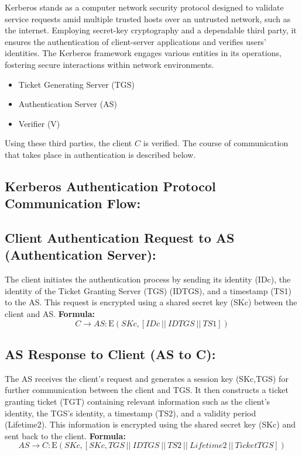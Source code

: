 \documentclass[11pt]{article}
\begin{document}
Kerberos stands as a computer network security protocol designed to validate service requests amid multiple trusted hosts over an untrusted network, such as the internet. Employing secret-key cryptography and a dependable third party, it ensures the authentication of client-server applications and verifies users' identities. The Kerberos framework engages various entities in its operations, fostering secure interactions within network environments.

\begin{itemize}
    \item Ticket Generating Server (TGS)
    \item Authentication Server (AS)
    \item Verifier (V)
\end{itemize}

Using these third parties, the client \(C\) is verified. The course of communication that takes place in authentication is described below.


\subsection{Kerberos Authentication Protocol Communication Flow:}

\subsection*{Client Authentication Request to AS (Authentication Server):}
The client initiates the authentication process by sending its identity (IDc), the identity of the Ticket Granting Server (TGS) (IDTGS), and a timestamp (TS1) to the AS. This request is encrypted using a shared secret key (SKc) between the client and AS.
\textbf{Formula:}
\[
C \rightarrow AS : \text{E}(SKc, [IDc \ || \ IDTGS \ || \ TS1])
\]

\subsection{AS Response to Client (AS to C):}
The AS receives the client's request and generates a session key (SKc,TGS) for further communication between the client and TGS. It then constructs a ticket granting ticket (TGT) containing relevant information such as the client's identity, the TGS's identity, a timestamp (TS2), and a validity period (Lifetime2). This information is encrypted using the shared secret key (SKc) and sent back to the client.
\textbf{Formula:}
\[
AS \rightarrow C : \text{E}(SKc, [SKc,TGS \ || \ IDTGS \ || \ TS2 \ || \ Lifetime2 \ || \ TicketTGS])
\]
\end{document}
